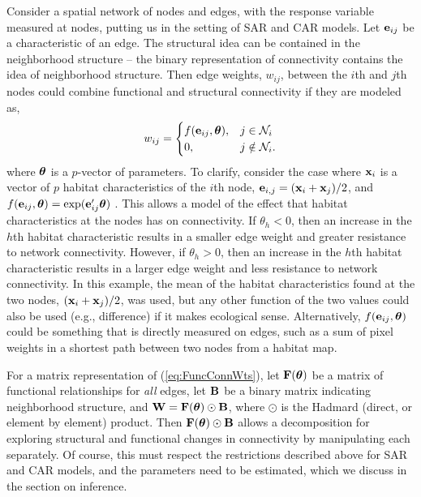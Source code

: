 \documentclass[11pt, titlepage]{article}\usepackage[]{graphicx}\usepackage[]{color}
\begin{document}
Consider a spatial network of nodes and edges, with the response variable measured at nodes, putting us in the setting of SAR and CAR models.  Let $\mathbf{e}_{ij}$ be a characteristic of an edge. The structural idea can be contained in the neighborhood structure -- the binary representation of connectivity contains the idea of neighborhood structure. Then edge weights, $w_{ij}$, between the $i$th and $j$th nodes could combine functional and structural connectivity if they are modeled as,
\begin{equation} \label{eq:FuncConnWts}
   w_{ij}= \begin{cases}
     f(\mathbf{e}_{ij}, \mbox{\boldmath $\theta$}), & j \in \mathcal{N}_i \\
            0, & j \notin \mathcal{N}_i. \\
    \end{cases}
\end{equation}
where $\mbox{\boldmath $\theta$}$ is a $p$-vector of parameters.  To clarify, consider the case where $\mathbf{x}_i$ is a vector of $p$ habitat characteristics of the $i$th node, $\mathbf{e}_{i,j} = (\mathbf{x}_i +\mathbf{x}_j)/2$, and $f(\mathbf{e}_{ij},\mbox{\boldmath $\theta$}) = \exp(\mathbf{e}^{\prime}_{ij}\mbox{\boldmath $\theta$})$ \citep{Hank:Hoot:circ:2013}. This allows a model of the effect that habitat characteristics at the nodes has on connectivity. If $\theta_h < 0$, then an increase in the $h$th habitat characteristic results in a smaller edge weight and greater resistance to network connectivity. However, if $\theta_h > 0$, then an increase in the $h$th habitat characteristic results in a larger edge weight and less resistance to network connectivity. In this example, the mean of the habitat characteristics found at the two nodes, $(\mathbf{x}_i +\mathbf{x}_j)/2$, was used, but any other function of the two values could also be used (e.g., difference) if it makes ecological sense.  Alternatively, $f(\mathbf{e}_{ij},\mbox{\boldmath $\theta$})$ could be something that is directly measured on edges, such as a sum of pixel weights in a shortest path between two nodes from a habitat map.   

For a matrix representation of (\ref{eq:FuncConnWts}), let $\mathbf{F}(\mbox{\boldmath $\theta$})$ be a matrix of functional relationships for \textit{all} edges, let $\mathbf{B}$ be a binary matrix indicating neighborhood structure, and $\mathbf{W} = \mathbf{F}(\mbox{\boldmath $\theta$}) \odot \mathbf{B}$, where $\odot$ is the Hadmard (direct, or element by element) product. Then $\mathbf{F}(\mbox{\boldmath $\theta$}) \odot \mathbf{B}$ allows a decomposition for exploring structural and functional changes in connectivity by manipulating each separately. Of course, this must respect the restrictions described above for SAR and CAR models, and the parameters need to be estimated, which we discuss in the section on inference.
\end{document}
